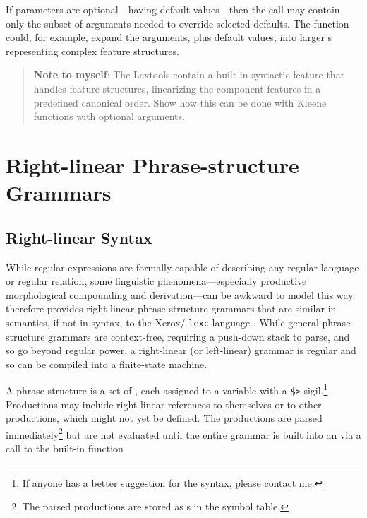 If parameters are optional---having default values---then the call
may contain only the subset of arguments needed to override selected
defaults.  The function could, for example, expand the arguments, plus default
values, into larger \fsm{}s representing complex feature structures.

\begin{quote}
\textbf{Note to myself}: The  Lextools contain a
built-in syntactic
feature that handles feature structures, linearizing
the component features in a predefined canonical order.  Show how this
can be done with Kleene functions with optional arguments.
\end{quote}

\section{Right-linear Phrase-structure Grammars}

\subsection{Right-linear Syntax}

While regular expressions are formally capable of describing any
regular language or regular relation, some linguistic
phenomena---especially productive morphological compounding and
derivation---can be awkward to model this way.  \Kleene{}
therefore provides right-linear phrase-structure grammars that
are similar in semantics, if not in syntax, to the
Xerox/ \texttt{lexc} language \citep{beesley+karttunen:2003}.  While general phrase-structure
grammars are context-free, requiring a push-down stack to parse, and so go beyond
regular power, a right-linear (or left-linear) grammar is regular and so can be
compiled into a finite-state machine.  


A \Kleene{} phrase-structure  is a set of
, each
assigned to a variable with a \verb!$>! sigil.\footnote{If anyone has a better
suggestion for the syntax, please contact me.}  Productions may
include right-linear references to themselves or to other
productions, which might not yet be defined.  The productions are parsed
immediately\footnote{The parsed productions are stored as s in the
symbol table.} but are not evaluated until the entire grammar is built
into an \fsm{} via a call to the built-in function

